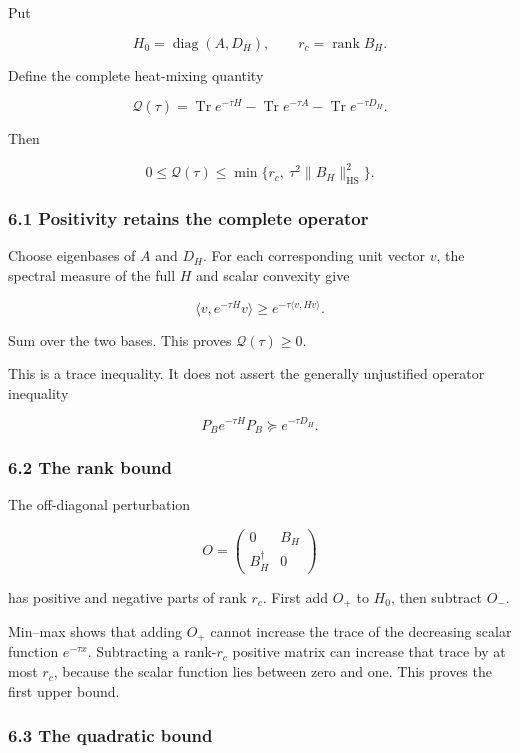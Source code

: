 \documentclass[11pt]{article}
\begin{document}
Put

\[
H_0=\operatorname{diag}(A,D_H),
\qquad
r_c=\operatorname{rank}B_H.
\]

Define the complete heat-mixing quantity

\[
\mathcal Q(\tau)
=
\operatorname{Tr}e^{-\tau H}
-\operatorname{Tr}e^{-\tau A}
-\operatorname{Tr}e^{-\tau D_H}.
\]

Then

\[
\boxed{
0\le\mathcal Q(\tau)
\le
\min\{r_c,\ \tau^2\|B_H\|_{\mathrm{HS}}^2\}.
}
\tag{43}
\]

\subsubsection{6.1 Positivity retains the complete operator}\label{positivity-retains-the-complete-operator}

Choose eigenbases of \(A\) and \(D_H\). For each corresponding unit vector \(v\), the spectral measure of the full \(H\) and scalar convexity give

\[
\langle v,e^{-\tau H}v\rangle
\ge e^{-\tau\langle v,Hv\rangle}.
\]

Sum over the two bases. This proves \(\mathcal Q(\tau)\ge0\).

This is a trace inequality. It does not assert the generally unjustified operator inequality

\[
P_Be^{-\tau H}P_B\succeq e^{-\tau D_H}.
\]

\subsubsection{6.2 The rank bound}\label{the-rank-bound}

The off-diagonal perturbation

\[
O=\begin{pmatrix}0&B_H\\B_H^\dagger&0\end{pmatrix}
\]

has positive and negative parts of rank \(r_c\). First add \(O_+\) to \(H_0\), then subtract \(O_-\).

Min--max shows that adding \(O_+\) cannot increase the trace of the decreasing scalar function \(e^{-\tau x}\). Subtracting a rank-\(r_c\) positive matrix can increase that trace by at most \(r_c\), because the scalar function lies between zero and one. This proves the first upper bound.

\subsubsection{6.3 The quadratic bound}\label{the-quadratic-bound}
\end{document}

